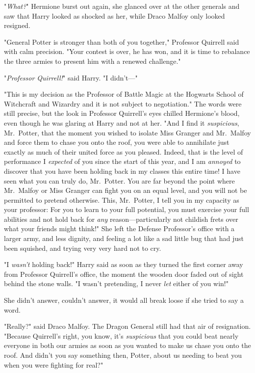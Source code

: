 "\emph{What?}" Hermione burst out again, she glanced over at the other generals 
and saw that Harry looked as shocked as her, while Draco Malfoy only looked 
resigned.

"General Potter is stronger than both of you together," Professor Quirrell said 
with calm precision. "Your contest is over, he has won, and it is time to 
rebalance the three armies to present him with a renewed challenge."

"\emph{Professor Quirrell!}" said Harry. "I didn't---"

"This is my decision as the Professor of Battle Magic at the Hogwarts School of 
Witchcraft and Wizardry and it is not subject to negotiation." The words were 
still precise, but the look in Professor Quirrell's eyes chilled Hermione's 
blood, even though he was glaring at Harry and not at her. "And I find it 
\emph{suspicious}, Mr.~Potter, that the moment you wished to isolate Miss 
Granger and Mr.~Malfoy and force them to chase you onto the roof, you were able 
to annihilate just exactly as much of their united force as you pleased. 
Indeed, that is the level of performance I \emph{expected} of you since the 
start of this year, and I am \emph{annoyed} to discover that you have been 
holding back in my classes this entire time! I have seen what you can truly do, 
Mr.~Potter. You are far beyond the point where Mr.~Malfoy or Miss Granger can 
fight you on an equal level, and you will not be permitted to pretend 
otherwise. This, Mr.~Potter, I tell you in my capacity as your professor: For 
you to learn to your full potential, you must exercise your full abilities and 
not hold back for \emph{any} reason---particularly not childish frets over what 
your friends might think!"
\sbreak
She left the Defense Professor's office with a larger army, and less dignity, 
and feeling a lot like a sad little bug that had just been squished, and trying 
very very hard not to cry.

"I \emph{wasn't} holding back!" Harry said as soon as they turned the first 
corner away from Professor Quirrell's office, the moment the wooden door faded 
out of sight behind the stone walls. "I wasn't pretending, I never \emph{let} 
either of you win!"

She didn't answer, couldn't answer, it would all break loose if she tried to 
say a word.

"Really?" said Draco Malfoy. The Dragon General still had that air of 
resignation. "Because Quirrell's right, you know, it's\emph{ suspicious} that 
you could beat nearly everyone in both our armies as soon as you wanted to make 
us chase you onto the roof. And didn't you say something then, Potter, about us 
needing to beat you when you were fighting for real?"

